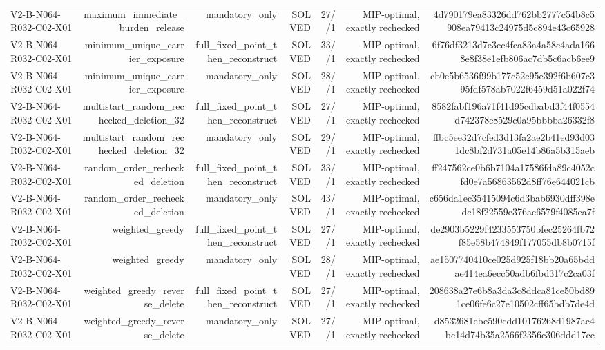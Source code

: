 {\begin{longtable}{lrrrrrr}
V2-B-N064-R032-C02-X01 & maximum\_immediate\_burden\_release & mandatory\_only & SOLVED & 27//1 & MIP-optimal, exactly rechecked & 4d790179ea83326dd762bb2777c54b8c5908ea79413c24975d5c894e43c65928 \\
V2-B-N064-R032-C02-X01 & minimum\_unique\_carrier\_exposure & full\_fixed\_point\_then\_reconstruct & SOLVED & 33//1 & MIP-optimal, exactly rechecked & 6f76df3213d7e3cc4fca83a4a58c4ada1668e8f38e1efb806ac7db5c6acb6ee9 \\
V2-B-N064-R032-C02-X01 & minimum\_unique\_carrier\_exposure & mandatory\_only & SOLVED & 28//1 & MIP-optimal, exactly rechecked & cb0e5b6536f99b177c52c95e392f6b607c395fdf578ab7022f6459d51a022f74 \\
V2-B-N064-R032-C02-X01 & multistart\_random\_rechecked\_deletion\_32 & full\_fixed\_point\_then\_reconstruct & SOLVED & 27//1 & MIP-optimal, exactly rechecked & 8582fabf196a71f41d95cdbabd3f44f0554d742378e8529c0a95bbbba26332f8 \\
V2-B-N064-R032-C02-X01 & multistart\_random\_rechecked\_deletion\_32 & mandatory\_only & SOLVED & 29//1 & MIP-optimal, exactly rechecked & ffbc5ee32d7cfed3d13fa2ae2b41ed93d031dc8bf2d731a05e14b86a5b315aeb \\
V2-B-N064-R032-C02-X01 & random\_order\_rechecked\_deletion & full\_fixed\_point\_then\_reconstruct & SOLVED & 33//1 & MIP-optimal, exactly rechecked & ff247562ce0b6b7104a17586fda89c4052cfd0e7a56863562d8ff76e644021cb \\
V2-B-N064-R032-C02-X01 & random\_order\_rechecked\_deletion & mandatory\_only & SOLVED & 43//1 & MIP-optimal, exactly rechecked & c656da1ec35415094c6d3bab6930dff398edc18f22559e376ae6579f4085ea7f \\
V2-B-N064-R032-C02-X01 & weighted\_greedy & full\_fixed\_point\_then\_reconstruct & SOLVED & 27//1 & MIP-optimal, exactly rechecked & de2903b5229f4233553750bfec25264fb72f85e58b474849f177055db8b0715f \\
V2-B-N064-R032-C02-X01 & weighted\_greedy & mandatory\_only & SOLVED & 28//1 & MIP-optimal, exactly rechecked & ae1507740410ce025d925f18bb20a65bddae414ea6ecc50adb6fbd317c2ca03f \\
V2-B-N064-R032-C02-X01 & weighted\_greedy\_reverse\_delete & full\_fixed\_point\_then\_reconstruct & SOLVED & 27//1 & MIP-optimal, exactly rechecked & 208638a27e6b8a3da3c8ddca81ce50bd891ce06fe6c27e10502cff65bdb7de4d \\
V2-B-N064-R032-C02-X01 & weighted\_greedy\_reverse\_delete & mandatory\_only & SOLVED & 27//1 & MIP-optimal, exactly rechecked & d8532681ebe590cdd10176268d1987ac4bc14d74b35a2566f2356c306ddd17cc \\

\end{longtable}}
